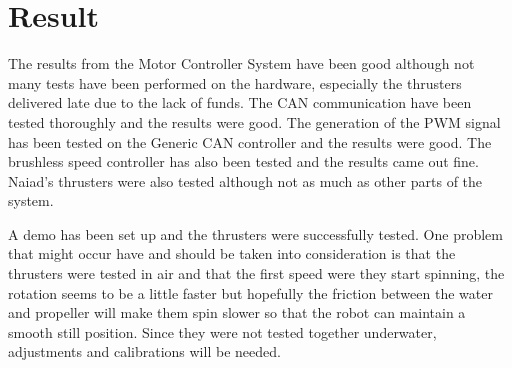 \section{Result}\label{sec:result}
The results from the Motor Controller System have been good although not many tests have been performed on the hardware, especially the thrusters delivered late due to the lack of funds. The CAN communication have been tested thoroughly and the results were good. The generation of the PWM signal has been tested on the Generic CAN controller and the results were good. The brushless speed controller has also been tested and the results came out fine. Naiad's thrusters were also tested although not as much as other parts of the system.

 A demo has been set up and the thrusters were successfully tested. One problem that might occur have and should be taken into consideration is that the thrusters were tested in air and  that the first speed were they start spinning, the rotation seems to be a little faster but hopefully the friction between the water and propeller will make them spin slower so that the robot can maintain a smooth still position. Since they were not tested together underwater, adjustments and calibrations will be needed.  

